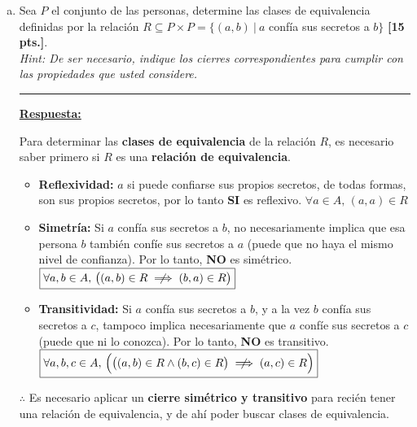 \documentclass[legalpaper,10pt]{article}
\begin{document}
\begin{enumerate}[a)]
\begin{enumerate}[1)]
\end{enumerate}





\newpage




\item Sea $P$ el conjunto de las personas, determine las clases de equivalencia definidas por la relación $R \subseteq P \times P = \{(a, b) ~|~ a$ confía sus secretos a $b\}$ \textbf{[15 pts.]}. \\ \textit{Hint: De ser necesario, indique los cierres correspondientes para cumplir con las propiedades que usted considere.}


\rule{5cm}{0.4pt}

\underline{\textbf{Respuesta:}}

Para determinar las \textbf{clases de equivalencia} de la relación $R$, es necesario saber primero si $R$ es una \textbf{relación de equivalencia}.

\begin{itemize}
    \item \textbf{Reflexividad:} $a$ si puede confiarse sus propios secretos, de todas formas, son sus propios secretos, por lo tanto \textbf{SI} es reflexivo. \(\boxed{\forall a \in A, \, (a,a) \in R}\)

    \vspace{1 em}

    \item \textbf{Simetría:} Si $a$ confía sus secretos a $b$, no necesariamente implica que esa persona $b$ también confíe sus secretos a $a$ (puede que no haya el mismo nivel de confianza). Por lo tanto, \textbf{NO} es simétrico. \(\boxed{\forall a,b \in A, \, \big( (a,b) \in R \centernot \implies (b,a) \in R\big)}\)

    \vspace{1 em}

    \item \textbf{Transitividad:} Si $a$ confía sus secretos a $b$, y a la vez $b$ confía sus secretos a $c$, tampoco implica necesariamente que $a$ confíe sus secretos a $c$ (puede que ni lo conozca). Por lo tanto, \textbf{NO} es transitivo. \(\boxed{\forall a,b,c \in A, \, \Big( \big( (a,b) \in R \land (b,c) \in R \big) \centernot \implies (a,c) \in R \Big)}\)
\end{itemize}

\(\therefore\) Es necesario aplicar un \textbf{cierre simétrico y transitivo} para recién tener una relación de equivalencia, y de ahí poder buscar clases de equivalencia.


\end{enumerate}
\end{document}
